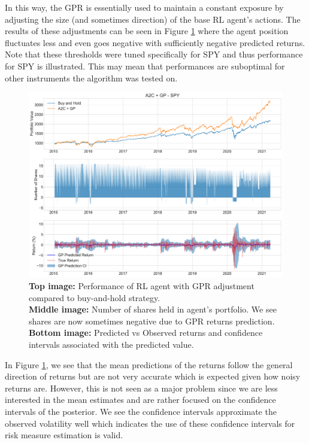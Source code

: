 \documentclass[12pt]{article}
\begin{document}
In this way, the GPR is essentially used to maintain a constant exposure by adjusting the size (and sometimes direction) of the base RL agent's actions. The results of these adjustments can be seen in Figure \ref{fig:rl with gp} where the agent position fluctuates less and even goes negative with sufficiently negative predicted returns. Note that these thresholds were tuned specifically for SPY and thus performance for SPY is illustrated. This may mean that performances are suboptimal for other instruments the algorithm was tested on.

\begin{figure}[H]
	\centering
	\includegraphics[width=\linewidth]{../src/figures/rl_with_gp_no_restrictions.pdf}
	\caption{\textbf{Top image:} Performance of RL agent with GPR adjustment compared to buy-and-hold strategy. \\ \textbf{Middle image:} Number of shares held in agent's portfolio. We see shares are now sometimes negative due to GPR returns prediction. \\ \textbf{Bottom image:} Predicted vs Observed returns and confidence intervals associated with the predicted value.}
	\label{fig:rl with gp}
\end{figure}

In Figure \ref{fig:rl with gp}, we see that the mean predictions of the returns follow the general direction of returns but are not very accurate which is expected given how noisy returns are. However, this is not seen as a major problem since we are less interested in the mean estimates and are rather focused on the confidence intervals of the posterior. We see the confidence intervals approximate the observed volatility well which indicates the use of these confidence intervals for risk measure estimation is valid.
\end{document}
